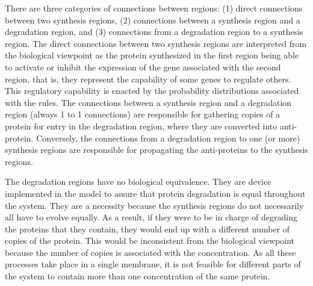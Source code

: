 \documentclass[runningheads,a4paper]{llncs}
\begin{document}
  There are three categories of connections between regions: 
    (1) direct connections between two synthesis regions,
    (2) connections between a synthesis region and a degradation region, and
    (3) connections from a degradation region to a synthesis region.
  The direct connections between two synthesis regions are interpreted from
  the biological viewpoint as the protein synthesized in the first region being
  able to activate or inhibit the expression of the gene associated with the second region,
  that is, 
  they represent the capability of some genes to regulate others.
  This regulatory capability is enacted by the probability distributions associated with the
  rules.
  The connections between a synthesis region and a degradation region
  (always 1 to 1 connections) are responsible for gathering copies of a protein
  for entry in the degradation region, where they are converted into
  anti-protein.
  Conversely, the connections from a degradation region to one
  (or more) synthesis regions are responsible for propagating the anti-proteins
  to the synthesis regions.

  The degradation regions have no biological equivalence. They are device
  implemented in the model to assure that protein degradation is equal
  throughout the system. They are a necessity because the synthesis regions do
  not necessarily all have to evolve equally. As a result, if they were to be
  in charge of degrading the proteins that they contain, they would end up with
  a different number of copies of the protein. This would be inconsistent from
  the biological viewpoint because the number of copies is associated with the
  concentration. As all these processes take place in a single membrane, it is
  not feasible for different parts of the system to contain more than one
  concentration of the same protein.
\end{document}

